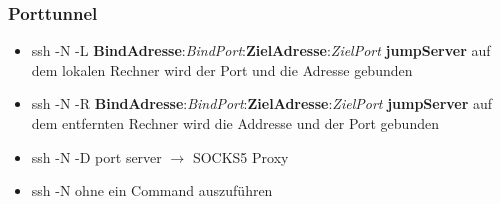 \begin{frame}
\frametitle{Porttunnel}
\begin{itemize}
\item ssh -N -L \textbf{BindAdresse}:\textit{BindPort}:\textbf{ZielAdresse}:\textit{ZielPort} \textbf{jumpServer} auf dem lokalen Rechner wird der Port und die Adresse gebunden
\pause
\item ssh -N -R \textbf{BindAdresse}:\textit{BindPort}:\textbf{ZielAdresse}:\textit{ZielPort} \textbf{jumpServer} auf dem entfernten Rechner wird die Addresse und der Port gebunden
\pause
\item ssh -N -D port server 	$\rightarrow$ SOCKS5 Proxy
\pause
\item ssh -N ohne ein Command auszuführen
\end{itemize}
\end{frame}